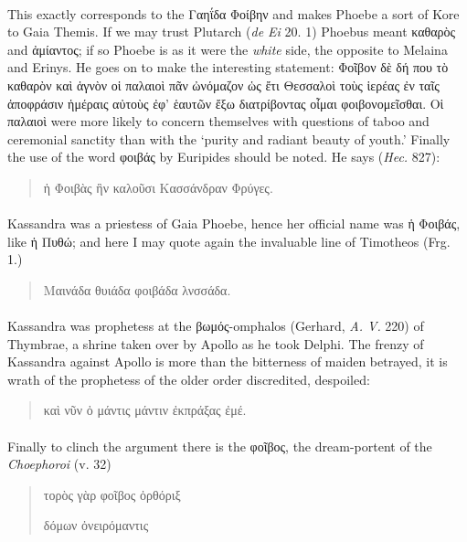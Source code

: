 \documentclass[a4paper, 11pt, oneside, polutonikogreek, english]{article}
\begin{document}
\paragraph{}
This exactly corresponds to the Γαηΐδα Φοίβην and makes Phoebe a sort of Kore to Gaia Themis. If we may trust Plutarch (\emph{de Ei} 20. 1) Phoebus meant καθαρὸς and ἀμίαντος; if so Phoebe is as it were the \emph{white} side, the opposite to Melaina and Erinys. He goes on to make the interesting statement: Φοῖβον δὲ δή που τὸ καθαρὸν καὶ ἁγνὸν οἱ παλαιοὶ πᾶν ὠνόμαζον ὡς ἔτι Θεσσαλοὶ τοὺς ἱερέας ἐν ταῖς ἀποφράσιν ἡμέραις αὐτοὺς ἐφ' ἑαυτῶν ἔξω διατρίβοντας οἶμαι φοιβονομεῖσθαι. Οἱ παλαιοὶ were more likely to concern themselves with questions of taboo and ceremonial sanctity than with the `purity and radiant beauty of youth.' Finally the use of the word φοιβάς by Euripides should be noted. He says (\emph{Hec.} 827):
\begin{quotation}
\large
ἡ Φοιβὰς ἣν καλοῦσι Κασσάνδραν Φρύγες.
\end{quotation}
\paragraph{}
Kassandra was a priestess of Gaia Phoebe, hence her official name was ἡ Φοιβάς, like ἡ Πυθώ; and here I may quote again the invaluable line of Timotheos (Frg. 1.)
\begin{quotation}
\large
Μαινάδα θυιάδα φοιβάδα λνσσάδα.
\end{quotation}
\paragraph{}
Kassandra was prophetess at the βωμός-omphalos (Gerhard, \emph{A. V.} 220) of Thymbrae, a shrine taken over by Apollo as he took Delphi. The frenzy of Kassandra against Apollo is more than the bitterness of maiden betrayed, it is wrath of the prophetess of the older order discredited, despoiled:
\begin{quotation}
\large
καὶ νῦν ὀ μάντις μάντιν ἐκπράξας ἐμέ.
\end{quotation}
\paragraph{}
Finally to clinch the argument there is the φοῖβος, the dream-portent of the \emph{Choephoroi} (v. 32)
\begin{quotation}
\large
τορὸς γὰρ φοῖβος ὀρθόριξ

δόμων ὀνειρόμαντις
\end{quotation}
\end{document}
